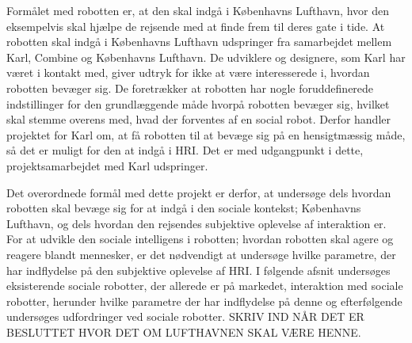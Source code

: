 \noindent
%
Formålet med robotten er, at den skal indgå i Københavns Lufthavn, hvor den eksempelvis skal hjælpe de rejsende med at finde frem til deres gate i tide. At robotten skal indgå i Københavns Lufthavn udspringer fra samarbejdet mellem Karl, Combine og Københavns Lufthavn. De udviklere og designere, som Karl har været i kontakt med, giver udtryk for ikke at være interesserede i, hvordan robotten bevæger sig. De foretrækker at robotten har nogle foruddefinerede indstillinger for den grundlæggende måde hvorpå robotten bevæger sig, hvilket skal stemme overens med, hvad der forventes af en social robot. Derfor handler projektet for Karl om, at få robotten til at bevæge sig på en hensigtmæssig måde, så det er muligt for den at indgå i HRI. Det er med udgangpunkt i dette, projektsamarbejdet med Karl udspringer. 

Det overordnede formål med dette projekt er derfor, at undersøge dels hvordan robotten skal bevæge sig for at indgå i den sociale kontekst; Københavns Lufthavn, og dels hvordan den rejsendes subjektive oplevelse af interaktion er.\blankline
%  
For at udvikle den sociale intelligens i robotten; hvordan robotten skal agere og reagere blandt mennesker, er det nødvendigt at undersøge hvilke parametre, der har indflydelse på den subjektive oplevelse af HRI. I følgende afsnit undersøges eksisterende sociale robotter, der allerede er på markedet, interaktion med sociale robotter, herunder hvilke parametre der har indflydelse på denne og efterfølgende undersøges udfordringer ved sociale robotter. SKRIV IND NÅR DET ER BESLUTTET HVOR DET OM LUFTHAVNEN SKAL VÆRE HENNE.   


